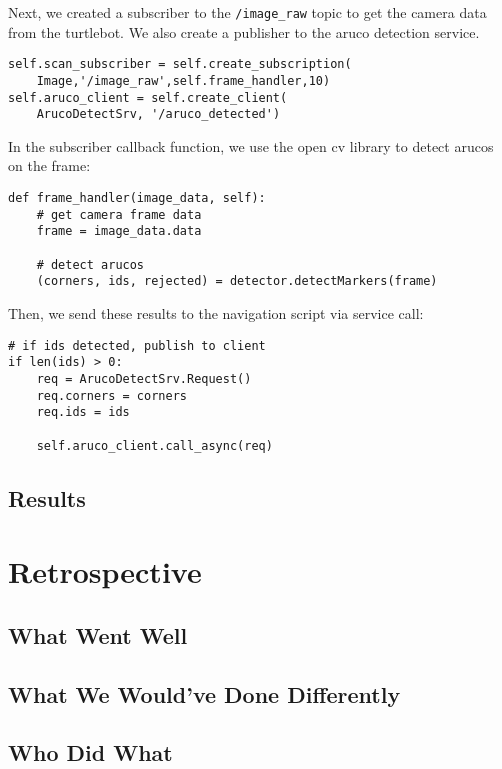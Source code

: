 \documentclass{article}
\begin{document}
Next, we created a subscriber to the \verb|/image_raw| topic to get the camera data from the turtlebot. We also create a publisher to the aruco detection service.

\begin{lstlisting}
self.scan_subscriber = self.create_subscription(
    Image,'/image_raw',self.frame_handler,10)
self.aruco_client = self.create_client(
    ArucoDetectSrv, '/aruco_detected')
\end{lstlisting}

In the subscriber callback function, we use the open cv library to detect arucos on the frame:

\begin{lstlisting}
def frame_handler(image_data, self):
    # get camera frame data
    frame = image_data.data

    # detect arucos
    (corners, ids, rejected) = detector.detectMarkers(frame)
\end{lstlisting}

Then, we send these results to the navigation script via service call:

\begin{lstlisting}
# if ids detected, publish to client
if len(ids) > 0:
    req = ArucoDetectSrv.Request()
    req.corners = corners
    req.ids = ids

    self.aruco_client.call_async(req)
\end{lstlisting}

\subsection{Results}

\section{Retrospective}

\subsection{What Went Well}

\subsection{What We Would've Done Differently}

\subsection{Who Did What}
\end{document}
